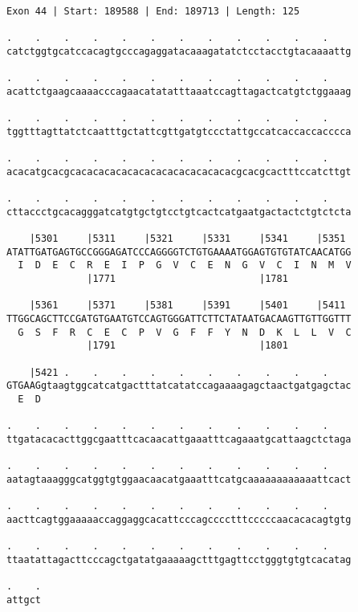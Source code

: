 \documentclass{article}
\begin{document}
\begin{Verbatim}
Exon 44 | Start: 189588 | End: 189713 | Length: 125
 
.    .    .    .    .    .    .    .    .    .    .    .    
catctggtgcatccacagtgcccagaggatacaaagatatctcctacctgtacaaaattg
  
.    .    .    .    .    .    .    .    .    .    .    .    
acattctgaagcaaaacccagaacatatatttaaatccagttagactcatgtctggaaag
  
.    .    .    .    .    .    .    .    .    .    .    .    
tggtttagttatctcaatttgctattcgttgatgtccctattgccatcaccaccacccca
  
.    .    .    .    .    .    .    .    .    .    .    .    
acacatgcacgcacacacacacacacacacacacacacacgcacgcactttccatcttgt
  
.    .    .    .    .    .    .    .    .    .    .    .    
cttaccctgcacagggatcatgtgctgtcctgtcactcatgaatgactactctgtctcta
  
    |5301     |5311     |5321     |5331     |5341     |5351 
ATATTGATGAGTGCCGGGAGATCCCAGGGGTCTGTGAAAATGGAGTGTGTATCAACATGG
  I  D  E  C  R  E  I  P  G  V  C  E  N  G  V  C  I  N  M  V
              |1771                         |1781           
  
    |5361     |5371     |5381     |5391     |5401     |5411 
TTGGCAGCTTCCGATGTGAATGTCCAGTGGGATTCTTCTATAATGACAAGTTGTTGGTTT
  G  S  F  R  C  E  C  P  V  G  F  F  Y  N  D  K  L  L  V  C
              |1791                         |1801           
  
    |5421 .    .    .    .    .    .    .    .    .    .    
GTGAAGgtaagtggcatcatgactttatcatatccagaaaagagctaactgatgagctac
  E  D                                                      
  
.    .    .    .    .    .    .    .    .    .    .    .    
ttgatacacacttggcgaatttcacaacattgaaatttcagaaatgcattaagctctaga
  
.    .    .    .    .    .    .    .    .    .    .    .    
aatagtaaagggcatggtgtggaacaacatgaaatttcatgcaaaaaaaaaaaattcact
  
.    .    .    .    .    .    .    .    .    .    .    .    
aacttcagtggaaaaaccaggaggcacattcccagcccctttcccccaacacacagtgtg
  
.    .    .    .    .    .    .    .    .    .    .    .    
ttaatattagacttcccagctgatatgaaaaagctttgagttcctgggtgtgtcacatag
  
.    .
attgct
\end{Verbatim}
\newpage
\end{document}
